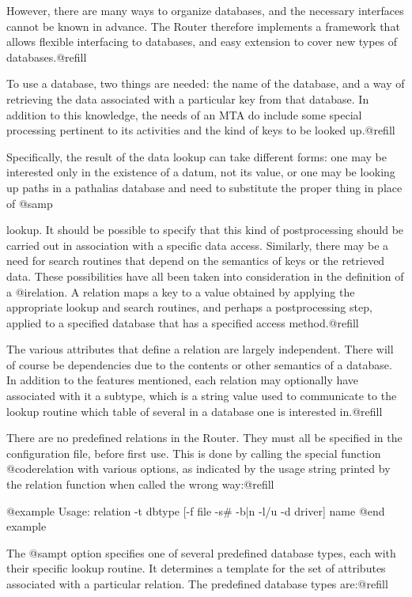 {However, there are many ways to organize databases, and the necessary
interfaces cannot be known in advance.  The Router therefore implements a
framework that allows flexible interfacing to databases, and easy extension
to cover new types of databases.@refill

To use a database, two things are needed: the name of the database, and
a way of retrieving the data associated with a particular key from that
database.  In addition to this knowledge, the needs of an MTA do include some
special processing pertinent to its activities and the kind of keys to be
looked up.@refill

Specifically, the result of the data lookup can take different forms:
one may be interested only in the existence of a datum, not its value, or one
may be looking up paths in a pathalias database and need to substitute the
proper thing in place of @samp{%
lookup.  It should be possible to specify that this kind of postprocessing
should be carried out in association with a specific data access.  Similarly,
there may be a need for search routines that depend on the semantics of keys
or the retrieved data.  These possibilities have all been taken into
consideration in the definition of a @i{relation}.  A relation maps a key to
a value obtained by applying the appropriate lookup and search routines,
and perhaps a postprocessing step, applied to a specified database that has a
specified access method.@refill

The various attributes that define a relation are largely independent.  There
will of course be dependencies due to the contents or other semantics of a
database.  In addition to the features mentioned, each relation may
optionally have associated with it a subtype, which is a string value
used to communicate to the lookup routine which table of several in a
database one is interested in.@refill

There are no predefined relations in the Router.  They must all be specified
in the configuration file, before first use.  This is done by calling the
special function @code{relation} with various options, as indicated by the usage
string printed by the relation function when called the wrong way:@refill

@example
Usage: relation -t dbtype [-f file -s# -b|n -l/u -d driver] name
@end example

The @samp{t} option specifies one of several predefined database types, each
with their specific lookup routine.  It determines a template for the set of
attributes associated with a particular relation.  The predefined database
types are:@refill

}}
